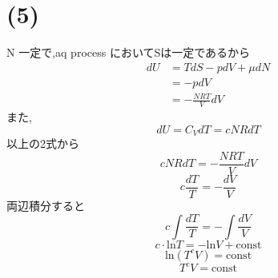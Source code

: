 \section*{(5)}
N 一定で,aq process においてSは一定であるから
\begin{align*}
dU 
&= TdS - pdV + \mu dN\\
&= -pdV\\
&=- \frac{NRT}{V} dV
\end{align*}
また,
\[dU = C_V dT = cNR dT\]
以上の2式から
\[cNR dT = -\frac{NRT}{V} dV\]
\[c \frac{dT}{T} = -\frac{dV}{V}\]
両辺積分すると
\[c \int \frac{dT}{T} = - \int \frac{dV}{V}\]
\[c\cdot \text{ln} T = - \text{ln} V + \text{const}\]
\[\text{ln} (T^c V) = \text{const}\]
\[T^c V = \text{const}\]